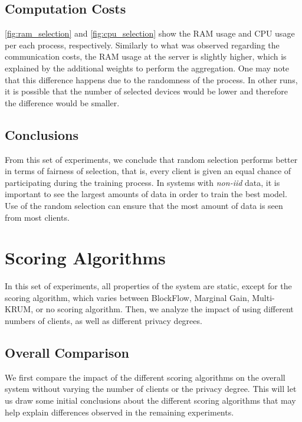 \subsection{Computation Costs}

\autoref{fig:ram_selection} and \autoref{fig:cpu_selection} show the RAM usage and CPU usage per each process, respectively. Similarly to what was observed regarding the communication costs, the RAM usage at the server is slightly higher, which is explained by the additional weights to perform the aggregation. One may note that this difference happens due to the randomness of the process. In other runs, it is possible that the number of selected devices would be lower and therefore the difference would be smaller.

\subsection{Conclusions}

From this set of experiments, we conclude that random selection performs better in terms of fairness of selection, that is, every client is given an equal chance of participating during the training process. In systems with \textit{non-iid} data, it is important to see the largest amounts of data in order to train the best model. Use of the random selection can ensure that the most amount of data is seen from most clients.

\section{Scoring Algorithms}

In this set of experiments, all properties of the system are static, except for the scoring algorithm, which varies between BlockFlow, Marginal Gain, Multi-KRUM, or no scoring algorithm. Then, we analyze the impact of using different numbers of clients, as well as different privacy degrees.

\subsection{Overall Comparison}\label{horizontal:scoring_overall}

We first compare the impact of the different scoring algorithms on the overall system without varying the number of clients or the privacy degree. This will let us draw some initial conclusions about the different scoring algorithms that may help explain differences observed in the remaining experiments.

